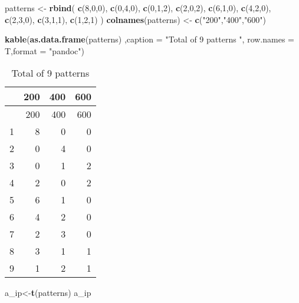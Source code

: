 \documentclass[
]{article}
\newenvironment{Shaded}{\begin{snugshade}}{\end{snugshade}}
\newcommand{\DataTypeTok}[1]{\textcolor[rgb]{0.13,0.29,0.53}{#1}}
\newcommand{\DecValTok}[1]{\textcolor[rgb]{0.00,0.00,0.81}{#1}}
\newcommand{\KeywordTok}[1]{\textcolor[rgb]{0.13,0.29,0.53}{\textbf{#1}}}
\newcommand{\NormalTok}[1]{#1}
\newcommand{\StringTok}[1]{\textcolor[rgb]{0.31,0.60,0.02}{#1}}
\begin{document}
\begin{Shaded}
\begin{Highlighting}[]
\NormalTok{patterns <-}\StringTok{ }\KeywordTok{rbind}\NormalTok{(}
\KeywordTok{c}\NormalTok{(}\DecValTok{8}\NormalTok{,}\DecValTok{0}\NormalTok{,}\DecValTok{0}\NormalTok{),}
\KeywordTok{c}\NormalTok{(}\DecValTok{0}\NormalTok{,}\DecValTok{4}\NormalTok{,}\DecValTok{0}\NormalTok{),}
\KeywordTok{c}\NormalTok{(}\DecValTok{0}\NormalTok{,}\DecValTok{1}\NormalTok{,}\DecValTok{2}\NormalTok{),}
\KeywordTok{c}\NormalTok{(}\DecValTok{2}\NormalTok{,}\DecValTok{0}\NormalTok{,}\DecValTok{2}\NormalTok{),}
\KeywordTok{c}\NormalTok{(}\DecValTok{6}\NormalTok{,}\DecValTok{1}\NormalTok{,}\DecValTok{0}\NormalTok{),}
\KeywordTok{c}\NormalTok{(}\DecValTok{4}\NormalTok{,}\DecValTok{2}\NormalTok{,}\DecValTok{0}\NormalTok{),}
\KeywordTok{c}\NormalTok{(}\DecValTok{2}\NormalTok{,}\DecValTok{3}\NormalTok{,}\DecValTok{0}\NormalTok{),}
\KeywordTok{c}\NormalTok{(}\DecValTok{3}\NormalTok{,}\DecValTok{1}\NormalTok{,}\DecValTok{1}\NormalTok{),}
\KeywordTok{c}\NormalTok{(}\DecValTok{1}\NormalTok{,}\DecValTok{2}\NormalTok{,}\DecValTok{1}\NormalTok{)}
\NormalTok{)}
\KeywordTok{colnames}\NormalTok{(patterns) <-}\StringTok{ }\KeywordTok{c}\NormalTok{(}\StringTok{"200"}\NormalTok{,}\StringTok{"400"}\NormalTok{,}\StringTok{"600"}\NormalTok{)}



\KeywordTok{kable}\NormalTok{(}\KeywordTok{as.data.frame}\NormalTok{(patterns) ,}\DataTypeTok{caption =} \StringTok{"Total of 9 patterns "}\NormalTok{, }\DataTypeTok{row.names =}\NormalTok{ T,}\DataTypeTok{format =} \StringTok{"pandoc"}\NormalTok{)}
\end{Highlighting}
\end{Shaded}

\begin{longtable}[]{@{}lrrr@{}}
\caption{Total of 9 patterns}\tabularnewline
\toprule
& 200 & 400 & 600\tabularnewline
\midrule
\endfirsthead
\toprule
& 200 & 400 & 600\tabularnewline
\midrule
\endhead
1 & 8 & 0 & 0\tabularnewline
2 & 0 & 4 & 0\tabularnewline
3 & 0 & 1 & 2\tabularnewline
4 & 2 & 0 & 2\tabularnewline
5 & 6 & 1 & 0\tabularnewline
6 & 4 & 2 & 0\tabularnewline
7 & 2 & 3 & 0\tabularnewline
8 & 3 & 1 & 1\tabularnewline
9 & 1 & 2 & 1\tabularnewline
\bottomrule
\end{longtable}

\begin{Shaded}
\begin{Highlighting}[]
\NormalTok{a_ip<-}\KeywordTok{t}\NormalTok{(patterns)}
\NormalTok{a_ip}
\end{Highlighting}
\end{Shaded}
\end{document}
